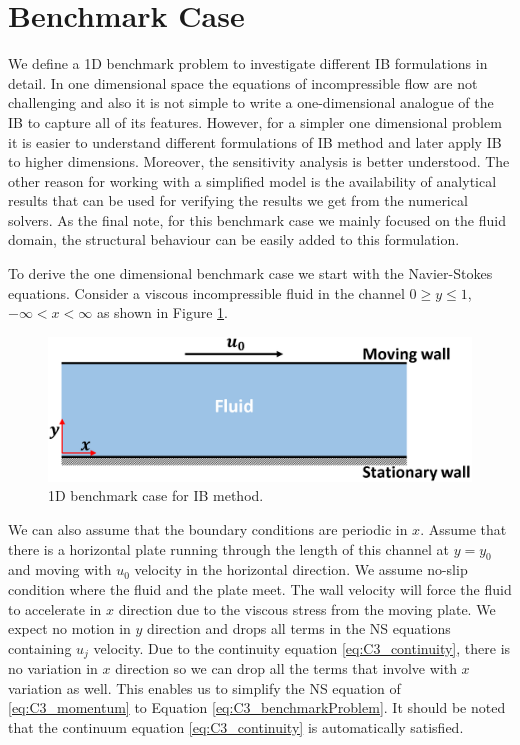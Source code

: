 \section{Benchmark Case}\label{sec:C3_benchmark_case}
We define a 1D benchmark problem to investigate different IB formulations in detail. In one dimensional space the equations of incompressible flow are not challenging and also it is not simple to write a one-dimensional analogue of the IB to capture all of its features. However, for a simpler one dimensional problem it is easier to understand different formulations of IB method and later apply IB to higher dimensions. Moreover, the sensitivity analysis is better understood. The other reason for working with a simplified model is the availability of analytical results that can be used for verifying the results we get from the numerical solvers. As the final note, for this benchmark case we mainly focused on the fluid domain, the structural behaviour can be easily added to this formulation.

To derive the one dimensional benchmark case we start with the Navier-Stokes equations. Consider a viscous incompressible fluid in the channel $0 \geq y \leq 1$, $-\infty < x < \infty$ as shown in Figure \ref{fig:C3_benchmarkCase}.

\begin{figure}[H]
    \centering
    \includegraphics[width=14.00cm]{Chapter_3/figure/C3_infinite_channel.png}
    \caption{1D benchmark case for IB method.}
    \label{fig:C3_benchmarkCase}
\end{figure}

We can also assume that the boundary conditions are periodic in $x$. Assume that there is a horizontal plate running through the length of this channel at $y=y_0$ and moving with $u_0$ velocity in the horizontal direction. We assume no-slip condition where the fluid and the plate meet. The wall velocity will force the fluid to accelerate in $x$ direction due to the viscous stress from the moving plate. We expect no motion in $y$ direction and drops all terms in the NS equations containing $u_j$ velocity. Due to the continuity equation \eqref{eq:C3_continuity}, there is no variation in $x$ direction so we can drop all the terms that involve with $x$ variation as well. This enables us to simplify the NS equation of \eqref{eq:C3_momentum} to Equation \eqref{eq:C3_benchmarkProblem}. It should be noted that the continuum equation \eqref{eq:C3_continuity} is automatically satisfied.

